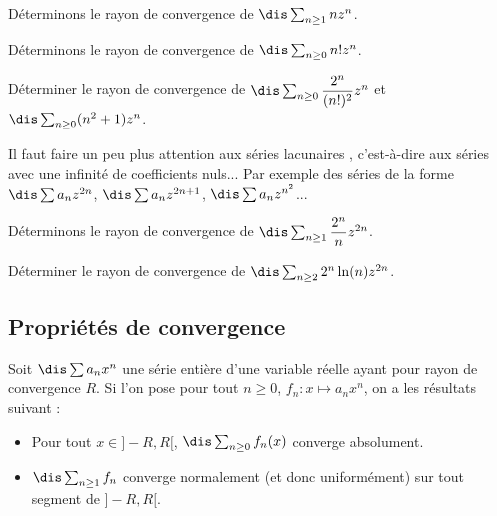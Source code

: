 \documentclass[a4paper,10pt]{report}
\begin{document}
%

\begin{ex} Déterminons le rayon de convergence de $\dis \sum_{n \geq 1} n z^n$.

\vspace{4cm}
\end{ex}

\begin{ex} Déterminons le rayon de convergence de $\dis \sum_{n \geq 0} n! z^n$.

\vspace{4cm}
\end{ex}

\begin{exa} Déterminer le rayon de convergence de $\dis \sum_{n \geq 0} \dfrac{2^n}{(n!)^2}z^n$ et $\dis \sum_{n \geq 0} (n^2+1)z^n$.
\end{exa}

\begin{att} Il faut faire un peu plus attention aux séries \og lacunaires \fg, c'est-à-dire aux séries avec une infinité de coefficients nuls... Par exemple des séries de la forme $\dis \sum a_n z^{2n}$, $\dis \sum a_n z^{2n+1}$, $\dis \sum a_n z^{n^2}$... 
%
\end{att}

\begin{ex} Déterminons le rayon de convergence de $\dis \sum_{n \geq 1} \dfrac{2^n}{n} z^{2n}$.

\vspace{5.5cm}
\end{ex}

\begin{exa} Déterminer le rayon de convergence de $\dis \sum_{n \geq 2} 2^n \ln(n) z^{2n}$.
\end{exa}

\subsection{Propriétés de convergence}
\begin{prop} Soit $\dis \sum a_n x^n$ une série entière d'une variable réelle ayant pour rayon de convergence $R$. Si l'on pose pour tout $n \geq 0$, $f_n : x \mapsto a_n x^n$, on a les résultats suivant :
\begin{itemize}
\item Pour tout $x \in ]-R,R[$, $\dis \sum_{n \geq 0} f_n(x)$ converge absolument.
\item $\dis \sum_{n \geq 1} f_n$ converge normalement (et donc uniformément) sur tout segment de $]-R,R[$.
\end{itemize}
\end{prop}
\end{document}
